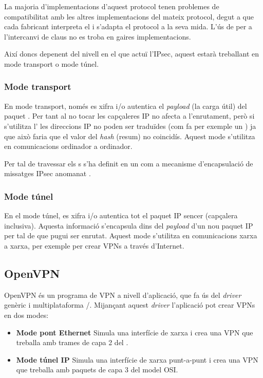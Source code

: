 La majoria d'implementacions d'aquest protocol tenen problemes de compatibilitat amb les altres implementacions del mateix protocol, degut a que cada fabricant interpreta el \rfckeyword{} i s'adapta el protocol a la seva mida. L'ús de  per a l'intercanvi de claus no es troba en gaires implementacions.

Així doncs depenent del nivell en el que actuï l'IPsec, aquest estarà treballant en mode transport o mode túnel.
\subsubsection{Mode transport}
En mode transport, només es xifra i/o autentica el \emph{payload} (la carga útil) del paquet . Per tant al no tocar les capçaleres IP no afecta a l'enrutament, però si s'utilitza l' les direccions IP no poden ser traduïdes (com fa per exemple un ) ja que això faria que el valor del \emph{hash} (resum) no coincidís. Aquest mode s'utilitza en comunicacions ordinador a ordinador.

Per tal de travessar els s s'ha definit en un  com a mecanisme d'encapsulació de missatges IPsec anomanat .
\subsubsection{Mode túnel}
En el mode túnel, es xifra i/o autentica tot el paquet IP sencer (capçalera inclusiva). Aquesta informació s'encapsula dins del \emph{payload} d'un nou paquet IP per tal de que pugui ser enrutat. Aquest mode s'utilitza en comunicacions xarxa a xarxa, per exemple per crear VPNs a través d'Internet.

\subsection{OpenVPN}
OpenVPN és un programa de VPN a nivell d'aplicació, que fa ús del \emph{driver} genèric i multiplataforma /. Mijançant aquest \emph{driver} l'aplicació pot crear VPNs en dos modes:
\begin{itemize}
\item \textbf{Mode pont Ethernet}
Simula una interfície de xarxa  i crea una VPN que treballa amb trames de capa 2 del .
\item \textbf{Mode túnel IP}
Simula una interfície de xarxa punt-a-punt i crea una VPN que treballa amb paquets de capa 3 del model OSI.
\end{itemize}

